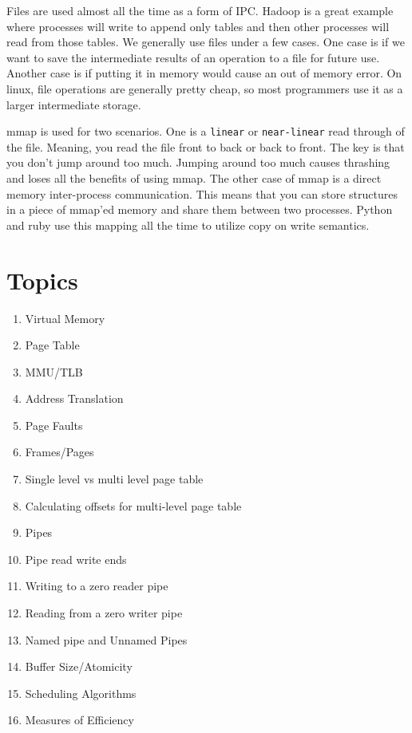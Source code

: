 Files are used almost all the time as a form of IPC. Hadoop is a great example where processes will write to append only tables and then other processes will read from those tables. We generally use files under a few cases. One case is if we want to save the intermediate results of an operation to a file for future use. Another case is if putting it in memory would cause an out of memory error. On linux, file operations are generally pretty cheap, so most programmers use it as a larger intermediate storage.

mmap is used for two scenarios. One is a \texttt{linear} or \texttt{near-linear} read through of the file. Meaning, you read the file front to back or back to front. The key is that you don't jump around too much. Jumping around too much causes thrashing and loses all the benefits of using mmap. The other case of mmap is a direct memory inter-process communication. This means that you can store structures in a piece of mmap'ed memory and share them between two processes. Python and ruby use this mapping all the time to utilize copy on write semantics.

\section{Topics}

\begin{enumerate}
  \item Virtual Memory
  \item Page Table
  \item MMU/TLB
  \item Address Translation
  \item Page Faults
  \item Frames/Pages
  \item Single level vs multi level page table
  \item Calculating offsets for multi-level page table
  \item Pipes
  \item Pipe read write ends
  \item Writing to a zero reader pipe
  \item Reading from a zero writer pipe
  \item Named pipe and Unnamed Pipes
  \item Buffer Size/Atomicity
  \item Scheduling Algorithms
  \item Measures of Efficiency
\end{enumerate}

